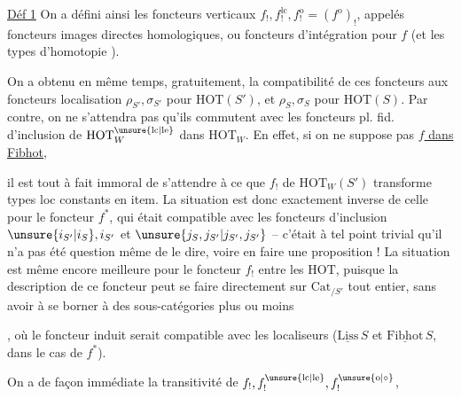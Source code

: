 
\uline{Déf 1} On a défini ainsi les foncteurs verticaux $f_!,f_!^{\mathrm{lc}},f_!^{\mathrm o}=(f^{\mathrm o})_!$, appelés foncteurs images directes homologiques, ou foncteurs d'intégration pour $f$ (et les types d'homotopie ).

On a obtenu en même temps, gratuitement, la compatibilité de ces foncteurs aux foncteurs localisation $\rho_{S'},\sigma_{S'}$  pour $\mathrm{HOT}(S')$, et $\rho_S,\sigma_S$ pour $\mathrm{HOT}(S)$. Par contre, on ne s'attendra pas qu'ils commutent avec les foncteurs pl. fid. d'inclusion de $\mathrm{HOT}^{\unsure{\mathrm{lc}|\mathrm{le}}}_W$ dans $\mathrm{HOT}_W$. En effet, si on ne suppose pas \uline{$f$ dans Fibhot},


il est tout à fait immoral de s'attendre à ce que $f_!$ de $\mathrm{HOT}_W(S')$ transforme types loc constants en item. La situation est donc exactement inverse de celle pour le foncteur $f^*$, qui était compatible avec les foncteurs d'inclusion $\unsure{i_{S'}|i_S},i_{S'}$ et $\unsure{j_S,j_{S'}|j_{S'},j_{S'}}$ -- c'était à tel point trivial qu'il n'a pas été question même de le dire, voire en faire une proposition ! La situation est même encore meilleure pour le foncteur $f_!$ entre les $\mathrm{HOT}$, puisque la description de ce foncteur peut se faire directement sur $\mathrm{Cat}_{/S'}$ tout entier, sans avoir à se borner à des sous-catégories plus ou moins

, où le foncteur induit serait compatible avec les localiseurs ($\underline{\mathrm{Liss}}\,S$ et $\underline{\mathrm{Fibhot}}\,S$, dans le cas de $f^*$).

On a de façon immédiate la transitivité de $f_!,f_!^{\unsure{\mathrm{lc}|\mathrm{le}}},f_!^{\unsure{\mathrm o|\circ}}$, 

